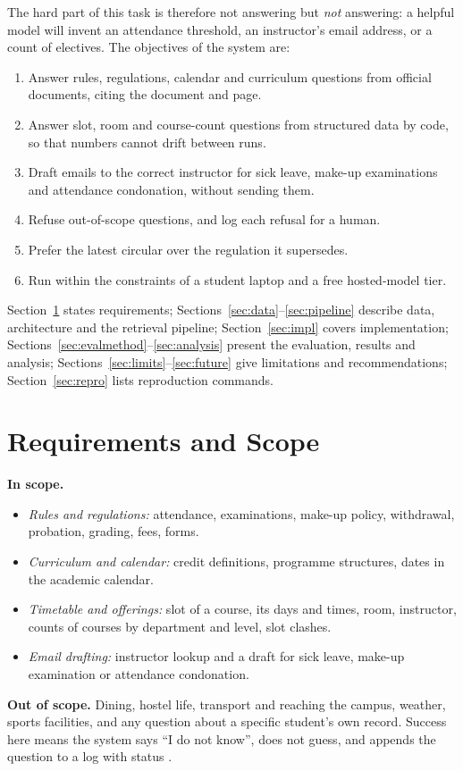 \documentclass[10pt,a4paper]{article}
\newcommand{\code}[1]{\texttt{\detokenize{#1}}}
\begin{document}
The hard part of this task is therefore not answering but \emph{not} answering: a helpful model will invent an attendance threshold, an instructor's email address, or a count of electives. The objectives of the system are:
\begin{enumerate}
  \item Answer rules, regulations, calendar and curriculum questions from official documents, citing the document and page.
  \item Answer slot, room and course-count questions from structured data by code, so that numbers cannot drift between runs.
  \item Draft emails to the correct instructor for sick leave, make-up examinations and attendance condonation, without sending them.
  \item Refuse out-of-scope questions, and log each refusal for a human.
  \item Prefer the latest circular over the regulation it supersedes.
  \item Run within the constraints of a student laptop and a free hosted-model tier.
\end{enumerate}
Section~\ref{sec:req} states requirements; Sections~\ref{sec:data}--\ref{sec:pipeline} describe data, architecture and the retrieval pipeline; Section~\ref{sec:impl} covers implementation; Sections~\ref{sec:evalmethod}--\ref{sec:analysis} present the evaluation, results and analysis; Sections~\ref{sec:limits}--\ref{sec:future} give limitations and recommendations; Section~\ref{sec:repro} lists reproduction commands.

\section{Requirements and Scope}\label{sec:req}
\textbf{In scope.}
\begin{itemize}
  \item \emph{Rules and regulations:} attendance, examinations, make-up policy, withdrawal, probation, grading, fees, forms.
  \item \emph{Curriculum and calendar:} credit definitions, programme structures, dates in the academic calendar.
  \item \emph{Timetable and offerings:} slot of a course, its days and times, room, instructor, counts of courses by department and level, slot clashes.
  \item \emph{Email drafting:} instructor lookup and a draft for sick leave, make-up examination or attendance condonation.
\end{itemize}
\textbf{Out of scope.} Dining, hostel life, transport and reaching the campus, weather, sports facilities, and any question about a specific student's own record. Success here means the system says ``I do not know'', does not guess, and appends the question to a log with status \code{pending_human_review}.
\end{document}
